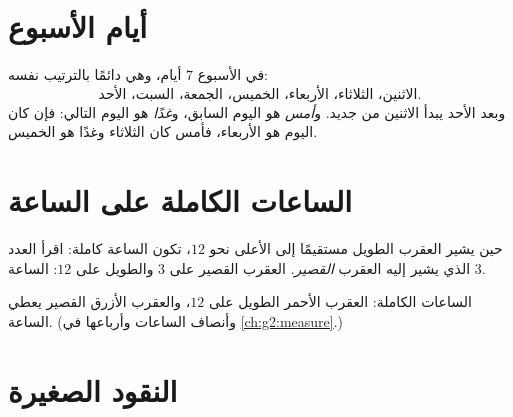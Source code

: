 \section{أيام الأسبوع}

\begin{example}\label{ex:g1:measure:days}
في الأسبوع $7$ أيام، وهي دائمًا بالترتيب نفسه:
\[
\text{الاثنين، الثلاثاء، الأربعاء، الخميس، الجمعة، السبت،
الأحد.}
\]
وبعد الأحد يبدأ الاثنين من جديد. و\emph{أمس} هو اليوم السابق،
و\emph{غدًا} هو اليوم التالي: فإن كان اليوم هو الأربعاء، فأمس كان
الثلاثاء وغدًا هو الخميس.
\end{example}

\section{الساعات الكاملة على الساعة}

\begin{method}\label{met:g1:measure:clock}
حين يشير العقرب الطويل مستقيمًا إلى الأعلى نحو $12$، تكون الساعة
كاملة: اقرأ العدد الذي يشير إليه العقرب \emph{القصير}. العقرب
القصير على $3$ والطويل على $12$: الساعة $3$.
\end{method}

\begin{omfigure}

{\small الساعات الكاملة: العقرب الأحمر الطويل على $12$، والعقرب
الأزرق القصير يعطي الساعة. (وأنصاف الساعات وأرباعها في
\cref{ch:g2:measure}.)}
\end{omfigure}

\section{النقود الصغيرة}

